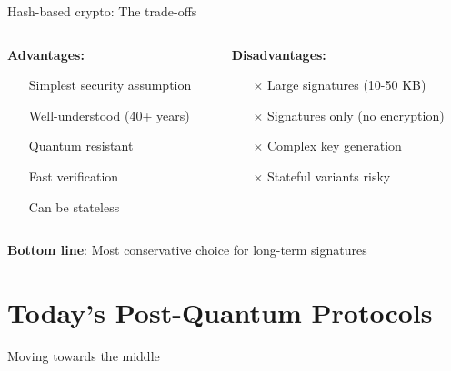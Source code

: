 \documentclass[aspectratio=169, lualatex, handout]{beamer}
\begin{document}
\begin{frame}{Hash-based crypto: The trade-offs}
	\begin{columns}[c]
		\begin{column}{0.5\textwidth}
			\textbf{Advantages:}
			\begin{itemize}
				\item[\mycheckmark] Simplest security assumption
				\item[\mycheckmark] Well-understood (40+ years)
				\item[\mycheckmark] Quantum resistant
				\item[\mycheckmark] Fast verification
				\item[\mycheckmark] Can be stateless
			\end{itemize}
		\end{column}
		\begin{column}{0.5\textwidth}
			\textbf{Disadvantages:}
			\begin{itemize}
				\item[$\times$] Large signatures (10-50 KB)
				\item[$\times$] Signatures only (no encryption)
				\item[$\times$] Complex key generation
				\item[$\times$] Stateful variants risky
			\end{itemize}
		\end{column}
	\end{columns}
	\vspace{5mm}
	\begin{center}
		\textbf{Bottom line}: Most conservative choice for long-term signatures
	\end{center}
\end{frame}

\section{Today's Post-Quantum Protocols}

\begin{frame}{Moving towards the middle}
\end{frame}
\end{document}
